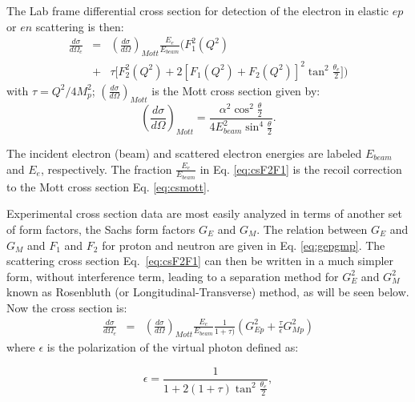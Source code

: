 The Lab frame differential cross section for detection of the electron in elastic $ep$ or $en$ scattering is then:
\begin{eqnarray}
\frac{d\sigma}{d\Omega_e} &=& \left(\frac{d\sigma}{d\Omega}\right)_{Mott}\frac{E_e}{E_{beam}} \Big(F_1^2(Q^2) \nonumber \\
& + & \mbox{} \tau\Big[F_2^2(Q^2) + 2[F_1(Q^2)+F_2(Q^2)]^2\tan^2\frac{\theta_e}{2}\Big]\Big)
\end{eqnarray}
\label{eq:csF2F1}
\noindent with $\tau=Q^2/4M_p^2$; $(\frac{d\sigma}{d\Omega})_{Mott}$ is the Mott cross section given by:
\begin{equation}
\left(\frac{d\sigma}{d\Omega}\right)_{Mott}=\frac{\alpha^2\cos^2\frac{\theta}{2}}{4E_{beam}^2\sin^4\frac{\theta}{2}}.
\label{eq:csmott}
\end{equation}

The incident electron (beam) and scattered electron energies are labeled $E_{beam}$ and $E_e$, respectively. The fraction $\frac{E_e}{E_{beam}}$
in Eq. \ref{eq:csF2F1} is the recoil correction to the Mott cross section Eq. \ref{eq:csmott}.

Experimental cross section data are most easily analyzed in terms of another set of form factors, the Sachs form 
factors $G_{E}$ and $G_{M}$. The relation between $G_{E}$ and $G_{M}$ and $F_1$ and $F_2$ for proton and neutron are given
 in Eq. \ref{eq:gepgmp}.
The scattering cross section Eq.~\ref{eq:csF2F1} can then be written in a much simpler form, without interference term, leading to a 
separation method for $G_{E}^2$ and $G_{M}^2$ known as Rosenbluth (or Longitudinal-Transverse) method, 
as will be seen below. Now the cross section is:
\begin{eqnarray}
\frac{d\sigma}{d\Omega_e} &=& \left(\frac{d\sigma}{d\Omega}\right)_{Mott}\frac{E_e}{E_{beam}}\frac{1}{1+\tau)} \left( G_{Ep}^2 + 
\frac{\tau}{\epsilon}G_{Mp}^2\right)
\label{eq:csgegm}
\end{eqnarray}
\noindent 
where $\epsilon$ is the polarization of the virtual photon defined as:

\begin{equation}
\epsilon=\frac{1}{1+2(1+\tau)\tan^2\frac{\theta_e}{2}}, 
\end{equation} 
\noindent 

